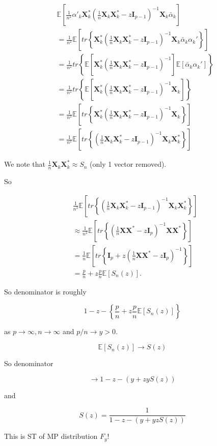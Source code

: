 \documentclass[twoside]{article}
\newcommand*\mean[1]{\bar{#1}}
\begin{document}
\begin{equation}
	\begin{split}
		&\mathbb{E}\left[\frac1{n^2}\alpha'_k\mathbf{X}_k^*\left(\frac1n\mathbf{X}_k\mathbf{X}_k^*-z\mathbf{I}_{p-1}\right)^{-1}\mathbf{X}_k\mean{\alpha}_k\right]\\
		&=\frac{1}{n^2}\mathbb{E}\left[tr\left\{\mathbf{X}_k^*\left(\frac1n\mathbf{X}_k\mathbf{X}_k^*-z\mathbf{I}_{p-1}\right)^{-1}\mathbf{X}_k\mean{\alpha}_k\alpha_k'\right\}\right]\\
		&=\frac{1}{n^2}tr\left\{\mathbb{E}\left[\mathbf{X}_k^*\left(\frac1n\mathbf{X}_k\mathbf{X}_k^*-z\mathbf{I}_{p-1}\right)^{-1}\right]\mathbb{E}\left[\mean{\alpha}_k\alpha_k'\right]\right\}\\
		&=\frac{1}{n^2}tr\left\{\mathbb{E}\left[\mathbf{X}_k^*\left(\frac1n\mathbf{X}_k\mathbf{X}_k^*-z\mathbf{I}_{p-1}\right)^{-1}\mathbf{X}_k\right]\right\}\\
		&=\frac{1}{n^2}\mathbb{E}\left[tr\left\{\mathbf{X}_k^*\left(\frac1n\mathbf{X}_k\mathbf{X}_k^*-z\mathbf{I}_{p-1}\right)^{-1}\mathbf{X}_k\right\}\right]\\
		&=\frac{1}{n^2}\mathbb{E}\left[tr\left\{\left(\frac1n\mathbf{X}_k\mathbf{X}_k^*-z\mathbf{I}_{p-1}\right)^{-1}\mathbf{X}_k\mathbf{X}^*_k\right\}\right]
	\end{split}
\end{equation}

We note that $\frac{1}{n}\mathbf{X}_k\mathbf{X}^*_k\approx S_n$ (only 1 vector removed).

So

\begin{equation}
	\begin{split}
		&\frac{1}{n^2}\mathbb{E}\left[tr\left\{\left(\frac{1}{n}\mathbf{X}_k\mathbf{X}_k^*-z\mathbf{I}_{p-1}\right)^{-1}\mathbf{X}_k\mathbf{X}_k^*\right\}\right]\\
		&\approx\frac{1}{n^2}\mathbb{E}\left[tr\left\{\left(\frac{1}{n}\mathbf{X}\mathbf{X}^*-z\mathbf{I}_{p}\right)^{-1}\mathbf{X}\mathbf{X}^*\right\}\right]\\
		&=\frac{1}{n}\mathbb{E}\left[tr\left\{\mathbf{I}_p+z\left(\frac{1}{n}\mathbf{X}\mathbf{X}^*-z\mathbf{I}_p\right)^{-1}\right\}\right]\\
		&=\frac{p}{n}+z\frac{p}{n}\mathbb{E}\left[S_n(z)\right].
	\end{split}
\end{equation}

So denominator is roughly

$$1-z-\left\{\frac{p}{n}+z\frac{p}{n}\mathbb{E}\left[S_n(z)\right]\right\}$$

as $p\to\infty, n\to\infty$ and $p/n\to y> 0$.

$$\mathbb{E}\left[S_n(z)\right]\to S(z)$$

So denominator

$$\to 1-z-(y+zyS(z))$$

and

$$S(z)=\frac{1}{1-z-(y+yzS(z))}$$

This is ST of MP distribution $F_y$!

\end{document}
